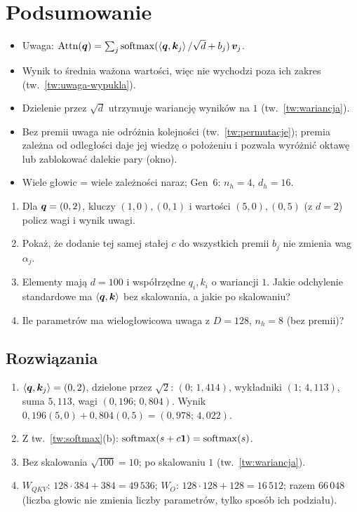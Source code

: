 \section*{Podsumowanie}
\begin{itemize}
\item Uwaga: $\operatorname{Attn}(\bm{q})=\sum_j\operatorname{softmax}(\left\langle \bm{q},\bm{k}_j\right\rangle/\sqrt d+b_j)\,\bm{v}_j$.
\item Wynik to średnia ważona wartości, więc nie wychodzi poza ich zakres (tw.~\ref{tw:uwaga-wypukla}).
\item Dzielenie przez $\sqrt d$ utrzymuje wariancję wyników na $1$ (tw.~\ref{tw:wariancja}).
\item Bez premii uwaga nie odróżnia kolejności (tw.~\ref{tw:permutacje}); premia zależna od odległości daje jej wiedzę o położeniu i pozwala wyróżnić oktawę lub zablokować dalekie pary (okno).
\item Wiele głowic = wiele zależności naraz; Gen~6: $n_h=4$, $d_h=16$.
\end{itemize}

\begin{sprawdz}
\begin{enumerate}
\item Dla $\bm{q}=(0,2)$, kluczy $(1,0),(0,1)$ i wartości $(5,0),(0,5)$ (z $d=2$) policz wagi i wynik uwagi.
\item Pokaż, że dodanie tej samej stałej $c$ do wszystkich premii $b_j$ nie zmienia wag $\alpha_j$.
\item Elementy mają $d=100$ i współrzędne $q_i,k_i$ o wariancji $1$. Jakie odchylenie standardowe ma $\left\langle \bm{q},\bm{k}\right\rangle$ bez skalowania, a jakie po skalowaniu?
\item Ile parametrów ma wielogłowicowa uwaga z $D=128$, $n_h=8$ (bez premii)?
\end{enumerate}
\end{sprawdz}

\subsection*{Rozwiązania}
\begin{enumerate}
\item $\left\langle \bm{q},\bm{k}_j\right\rangle=(0,2)$, dzielone przez $\sqrt2$: $(0;\,1{,}414)$, wykładniki $(1;\,4{,}113)$, suma $5{,}113$, wagi $(0{,}196;\,0{,}804)$. Wynik $0{,}196(5,0)+0{,}804(0,5)=(0{,}978;\,4{,}022)$.
\item Z tw.~\ref{tw:softmax}(b): $\operatorname{softmax}(s+c\bm{1})=\operatorname{softmax}(s)$.
\item Bez skalowania $\sqrt{100}=10$; po skalowaniu $1$ (tw.~\ref{tw:wariancja}).
\item $W_{QKV}$: $128\cdot384+384=49\,536$; $W_O$: $128\cdot128+128=16\,512$; razem $66\,048$ (liczba głowic nie zmienia liczby parametrów, tylko sposób ich podziału).
\end{enumerate}
